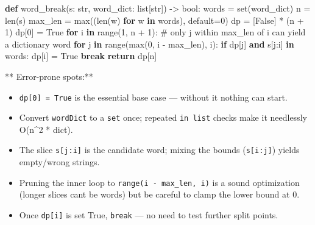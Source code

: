 \documentclass[11pt]{article}
\providecommand{\tightlist}{\setlength{\itemsep}{1pt}\setlength{\parskip}{0pt}}
\newenvironment{Shaded}{\begin{snugshade}}{\end{snugshade}}
\newcommand{\BuiltInTok}[1]{\textcolor[rgb]{0.50,0.55,0.55}{#1}}
\newcommand{\CommentTok}[1]{\textcolor[rgb]{0.48,0.49,0.49}{#1}}
\newcommand{\ControlFlowTok}[1]{\textcolor[rgb]{0.99,0.74,0.29}{\textbf{#1}}}
\newcommand{\DecValTok}[1]{\textcolor[rgb]{0.96,0.45,0.00}{#1}}
\newcommand{\KeywordTok}[1]{\textcolor[rgb]{0.81,0.81,0.76}{\textbf{#1}}}
\newcommand{\NormalTok}[1]{\textcolor[rgb]{0.81,0.81,0.76}{#1}}
\newcommand{\OperatorTok}[1]{\textcolor[rgb]{0.81,0.81,0.76}{#1}}
\newcommand{\VariableTok}[1]{\textcolor[rgb]{0.15,0.68,0.68}{#1}}
\begin{document}

\begin{Shaded}
\begin{Highlighting}[]
\KeywordTok{def}\NormalTok{ word\_break(s: }\BuiltInTok{str}\NormalTok{, word\_dict: }\BuiltInTok{list}\NormalTok{[}\BuiltInTok{str}\NormalTok{]) }\OperatorTok{{-}\textgreater{}} \BuiltInTok{bool}\NormalTok{:}
\NormalTok{    words }\OperatorTok{=} \BuiltInTok{set}\NormalTok{(word\_dict)}
\NormalTok{    n }\OperatorTok{=} \BuiltInTok{len}\NormalTok{(s)}
\NormalTok{    max\_len }\OperatorTok{=} \BuiltInTok{max}\NormalTok{((}\BuiltInTok{len}\NormalTok{(w) }\ControlFlowTok{for}\NormalTok{ w }\KeywordTok{in}\NormalTok{ words), default}\OperatorTok{=}\DecValTok{0}\NormalTok{)}
\NormalTok{    dp }\OperatorTok{=}\NormalTok{ [}\VariableTok{False}\NormalTok{] }\OperatorTok{*}\NormalTok{ (n }\OperatorTok{+} \DecValTok{1}\NormalTok{)}
\NormalTok{    dp[}\DecValTok{0}\NormalTok{] }\OperatorTok{=} \VariableTok{True}
    \ControlFlowTok{for}\NormalTok{ i }\KeywordTok{in} \BuiltInTok{range}\NormalTok{(}\DecValTok{1}\NormalTok{, n }\OperatorTok{+} \DecValTok{1}\NormalTok{):}
        \CommentTok{\# only j within max\_len of i can yield a dictionary word}
        \ControlFlowTok{for}\NormalTok{ j }\KeywordTok{in} \BuiltInTok{range}\NormalTok{(}\BuiltInTok{max}\NormalTok{(}\DecValTok{0}\NormalTok{, i }\OperatorTok{{-}}\NormalTok{ max\_len), i):}
            \ControlFlowTok{if}\NormalTok{ dp[j] }\KeywordTok{and}\NormalTok{ s[j:i] }\KeywordTok{in}\NormalTok{ words:}
\NormalTok{                dp[i] }\OperatorTok{=} \VariableTok{True}
                \ControlFlowTok{break}
    \ControlFlowTok{return}\NormalTok{ dp[n]}
\end{Highlighting}
\end{Shaded}

** Error-prone spots:**

\begin{itemize}
\tightlist
\item
  \texttt{dp{[}0{]}\ =\ True} is the essential base case --- without it nothing can start.
\item
  Convert \texttt{wordDict} to a \texttt{set} once; repeated \texttt{in\ list} checks make it needlessly O(n\^{}2 * dict).
\item
  The slice \texttt{s{[}j:i{]}} is the candidate word; mixing the bounds (\texttt{s{[}i:j{]}}) yields empty/wrong strings.
\item
  Pruning the inner loop to \texttt{range(i\ -\ max\_len,\ i)} is a sound optimization (longer slices can\textquotesingle t be words) but be careful to clamp the lower bound at 0.
\item
  Once \texttt{dp{[}i{]}} is set True, \texttt{break} --- no need to test further split points.
\end{itemize}
\end{document}
